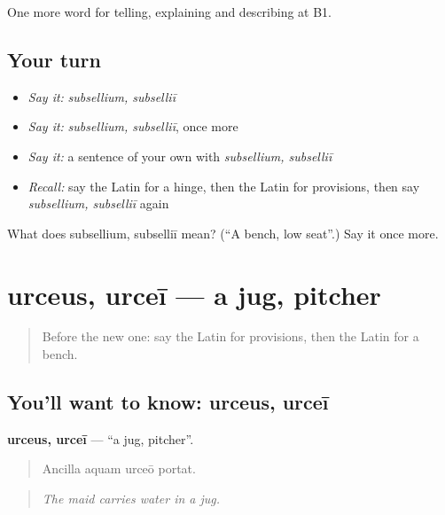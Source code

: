 \begin{grammarlens}[title={What you've built}]
One more word for telling, explaining and describing at B1.
\end{grammarlens}

\subsection*{Your turn}
\begin{itemize}
\raggedright
  \item \emph{Say it:} \emph{subsellium, subselliī}
  \item \emph{Say it:} \emph{subsellium, subselliī}, once more
  \item \emph{Say it:} a sentence of your own with \emph{subsellium, subselliī}
  \item \emph{Recall:} say the Latin for a hinge, then the Latin for provisions, then say \emph{subsellium, subselliī} again
\end{itemize}

\begin{tcolorbox}[breakable,colback=teal!4,colframe=teal!35!black,title={Before you move on}]
What does subsellium, subselliī mean? (\textquotedblleft{}A bench, low seat\textquotedblright{}.) Say it once more.
\end{tcolorbox}
\section[urceus, urceī]{urceus, urceī — a jug, pitcher}

\label{lesson:LA-C554-urceus}



\begin{quote}
Before the new one: say the Latin for provisions, then the Latin for a bench.
\end{quote}

\subsection*{You'll want to know: urceus, urceī}
\textbf{urceus, urceī} — \textquotedblleft{}a jug, pitcher\textquotedblright{}.

\begin{quote}
Ancilla aquam urceō portat.
\end{quote}

\begin{quote}
\emph{The maid carries water in a jug.}
\end{quote}

